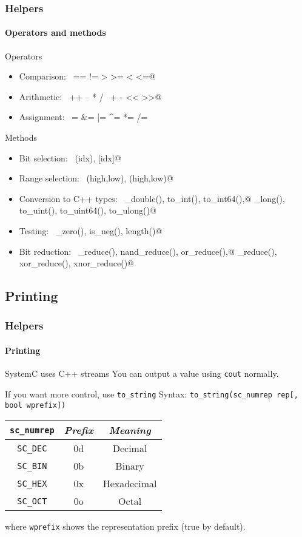 \begin{frame}[fragile]
\frametitle{Helpers}
\framesubtitle{Operators and methods}
{\scriptsize 
\begin{block}{Operators}
\begin{itemize}
\item Comparison: \, \verb@== != > >= < <=@
\item Arithmetic: \, \verb@++ -- * / \ + - << >>@
\item Assignment: \, \verb@= &= |= ^=  *= /= %= += -= <<= >>=@
\end{itemize}
\end{block}
\pause
\begin{block}{Methods}
\begin{itemize}
\item Bit selection: \, \verb@bit(idx), [idx]@
\item Range selection: \, \verb@range(high,low), (high,low)@
\item Conversion to C++ types: \, \verb@to_double(), to_int(), to_int64(),@ \verb@to_long(), to_uint(), to_uint64(), to_ulong()@
\item Testing: \, \verb@is_zero(), is_neg(), length()@
\item Bit reduction: \, \verb@and_reduce(), nand_reduce(), or_reduce(),@ \verb@nor_reduce(), xor_reduce(), xnor_reduce()@
\end{itemize}
\end{block}
}
\end{frame}

\subsection{Printing}

\begin{frame}
\frametitle{Helpers}
\framesubtitle{Printing}

\begin{block}{SystemC uses C++ streams}
You can output a value using \texttt{cout} normally.
\end{block}
\pause
\begin{block}{If you want more control, use \texttt{to\_string}}
Syntax:
\texttt{to\_string(sc\_numrep rep[, bool wprefix])}
\begin{table}
\begin{tabular}{|c|c|c|}
\hline
\texttt{sc\_numrep} & {\em Prefix} & {\em Meaning} \\
\hline
\texttt{SC\_DEC} & 0d & Decimal \\
\hline
\texttt{SC\_BIN} & 0b & Binary \\
\hline
\texttt{SC\_HEX} & 0x & Hexadecimal \\
\hline
\texttt{SC\_OCT} & 0o & Octal \\
\hline
\end{tabular}
\end{table}
where \texttt{wprefix} shows the representation prefix (true by default).
\end{block}
\end{frame}


